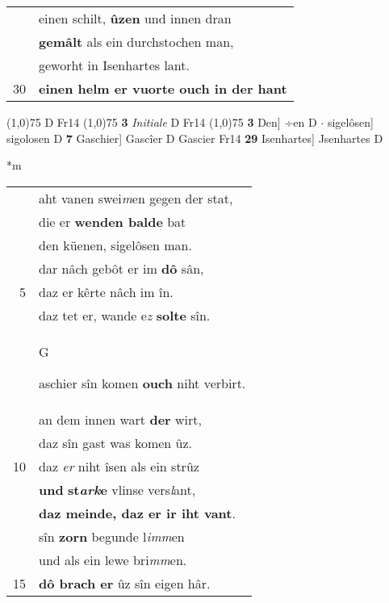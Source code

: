 \documentclass[8pt,a4paper,notitlepage]{article}
\begin{document}
\begin{table}[ht]
\begin{minipage}[t]{0.5\linewidth}
\begin{tabular}{rl}
 & einen schilt, \textbf{ûzen} und innen dran\\ 
 & \textbf{gemâlt} als ein durchstochen man,\\ 
 & geworht in Isenhartes lant.\\ 
30 & \textbf{einen helm er vuorte ouch in der hant}\\ 
\end{tabular}
\scriptsize
\line(1,0){75} \newline
D Fr14 \newline
\line(1,0){75} \newline
\textbf{3} \textit{Initiale} D Fr14  \newline
\line(1,0){75} \newline
\textbf{3} Den] ÷en D  $\cdot$ sigelôsen] sigolosen D \textbf{7} Gaschier] Gascîer D Gascier Fr14 \textbf{29} Isenhartes] Jsenhartes D \newline
\end{minipage}
\hspace{0.5cm}
\begin{minipage}[t]{0.5\linewidth}
\small
\begin{center}*m
\end{center}
\begin{tabular}{rl}
 & aht vanen swei\textit{m}en gegen der stat,\\ 
 & die er \textbf{wenden balde} bat\\ 
 & den küenen, sigelôsen man.\\ 
 & dar nâch gebôt er im \textbf{dô} sân,\\ 
5 & daz er kêrte nâch im în.\\ 
 & daz tet er, wande e\textit{z} \textbf{solte} sîn.\\ 
 & \begin{large}G\end{large}aschier sîn komen \textbf{ouch} niht verbirt.\\ 
 & an dem innen wart \textbf{der} wirt,\\ 
 & daz sîn gast was komen ûz.\\ 
10 & daz \textit{er} niht îsen als ein strûz\\ 
 & \textbf{und} \textbf{st\textit{ark}e} vlinse vers\textit{l}ant,\\ 
 & \textbf{daz meinde, daz er ir iht vant}.\\ 
 & sîn \textbf{zorn} begunde l\textit{imm}en\\ 
 & und als ein lewe bri\textit{mm}en.\\ 
15 & \textbf{dô brach er} ûz sîn eigen hâr.\\ 

\end{tabular}
\end{minipage}
\end{table}
\end{document}
